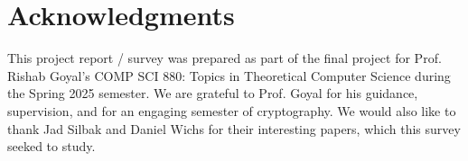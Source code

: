 \documentclass[12pt]{article}%
\begin{document}
\section{Acknowledgments}

This project report / survey was prepared as part of the final project for Prof. Rishab Goyal’s COMP SCI 880: Topics in Theoretical Computer Science during the Spring 2025 semester. We are grateful to Prof. Goyal for his guidance, supervision, and for an engaging semester of cryptography. We would also like to thank Jad Silbak and Daniel Wichs for their interesting papers, which this survey seeked to study.
    
\newpage
\end{document}
